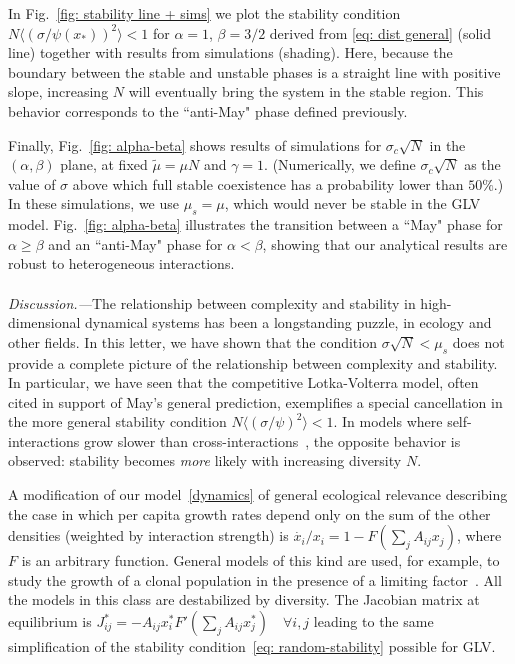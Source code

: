 \documentclass[
 prl,
 twocolumn,
 amsmath,
 amssymb,
 aps,
]{revtex4-2}
\begin{document}
In Fig.~\ref{fig: stability line + sims} we plot the stability condition $N\langle (\sigma/\psi(x_*))^2\rangle < 1$ for $\alpha = 1$, $\beta = 3/2$ derived from \eqref{eq: dist general} (solid line) together with results from simulations (shading). Here, because the boundary between the stable and unstable phases is a straight line with positive slope, increasing $N$ will eventually bring the system in the stable region. This behavior corresponds to the ``anti-May" phase defined previously. 

Finally, Fig.~\ref{fig: alpha-beta} shows results of simulations for $\sigma_c\sqrt{N}$ in the $(\alpha,\beta)$ plane, at fixed $\tilde{\mu}=\mu N$ and $\gamma = 1$. (Numerically, we define $\sigma_c\sqrt{N}$ as the value of $\sigma$ above which full stable coexistence has a probability lower than $50\%$.) In these simulations, we use $\mu_s = \mu$, which would never be stable in the GLV model. Fig.~\ref{fig: alpha-beta} illustrates the transition between a ``May" phase for $\alpha \geq \beta$ and an ``anti-May" phase for $\alpha < \beta$, showing that our analytical results are robust to heterogeneous interactions.

\paragraph*{}
\emph{Discussion.---}The relationship between complexity and stability in high-dimensional dynamical systems has been a longstanding puzzle, in ecology and other fields. 
In this letter, we have shown that the condition $\sigma\sqrt{N}< \mu_s$ does not provide a complete picture of the relationship between complexity and stability. 
In particular, we have seen that the competitive Lotka-Volterra model, often cited in support of May's general prediction, exemplifies a special cancellation in the more general stability condition $N\langle (\sigma/\psi)^2\rangle < 1$.
In models where self-interactions grow slower than cross-interactions~\cite{Hatton2024,samadder2024interconnection}, the opposite behavior is observed: stability becomes \emph{more} likely with increasing diversity $N$.

A modification of our model~\eqref{dynamics} of general ecological relevance describing the case in which per capita growth rates depend only on the sum of the other densities (weighted by interaction strength) is $\dot{x_i}/x_i=1-F(\sum_jA_{ij}x_j)$, where $F$ is an arbitrary function.
General models of this kind are used, for example, to study the growth of a clonal population in the presence of a limiting factor~\cite{mazzolini2023universality}.
All the models in this class are destabilized by diversity.
The Jacobian matrix at equilibrium is $J_{ij}^*=-A_{ij}x_i^*F'(\sum_jA_{ij}x_j^*) \quad \forall i,j$ leading to the same simplification of the stability condition~\eqref{eq: random-stability} possible for GLV.
\end{document}
